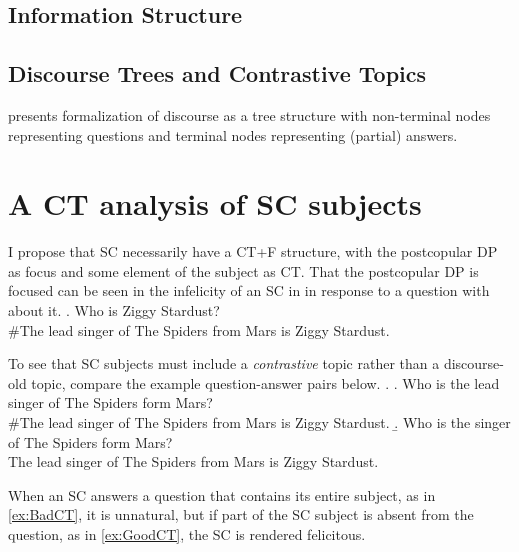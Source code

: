\documentclass[letterpaper]{article}
\begin{document}
\subsection{Information Structure}

\subsection{Discourse Trees and Contrastive Topics}
\textcite{buring2003d} presents  formalization of discourse as a tree structure with non-terminal nodes representing questions and terminal nodes representing (partial) answers.

\section{A CT analysis of SC subjects}
I propose that SC necessarily have a CT+F structure, with the postcopular DP as focus and some element of the subject as CT.
That the postcopular DP is focused can be seen in the infelicity of an SC in in response to a question with about it.
\ex.\label{ex:BadFocus} Who is Ziggy Stardust?\\
\#The lead singer of The Spiders from Mars is Ziggy Stardust.

To see that SC subjects must include a \textit{contrastive} topic rather than a discourse-old topic, compare the example question-answer pairs below.
\ex.
\a.\label{ex:BadCT} Who is the lead singer of The Spiders form Mars?\\
\#The lead singer of The Spiders from Mars is Ziggy Stardust.
\b.\label{ex:GoodCT} Who is the singer of The Spiders form Mars?\\
The lead singer of The Spiders from Mars is Ziggy Stardust.

When an SC answers a question that contains its entire subject, as in \ref{ex:BadCT}, it is unnatural, but if part of the SC subject is absent from the question, as in \ref{ex:GoodCT}, the SC is rendered felicitous.

\printbibliography
\end{document}
